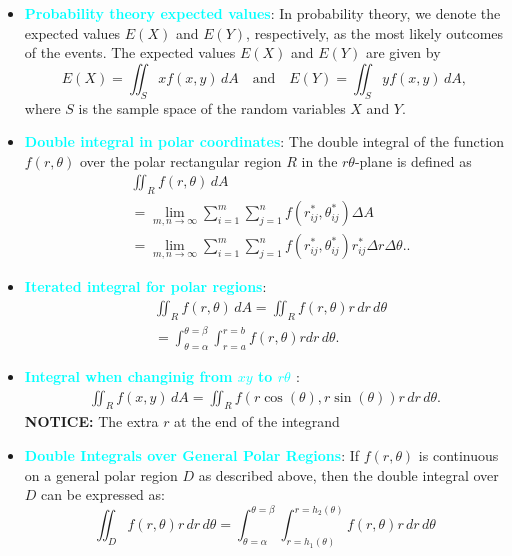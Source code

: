 \documentclass{report}
\begin{document}
\begin{itemize}
        \item \textbf{\textcolor{cyan}{Probability theory expected values}}:
            In probability theory, we denote the expected values \(E(X)\) and \(E(Y)\), respectively, as the most likely outcomes of the events. The expected values \(E(X)\) and \(E(Y)\) are given by
            \[
                E(X) = \iint_S x f(x,y) \, dA \quad \text{and} \quad E(Y) = \iint_S y f(x,y) \, dA,
            \]
            where \(S\) is the sample space of the random variables \(X\) and \(Y\).
        \item \textbf{\textcolor{cyan}{Double integral in polar coordinates}}:
            The double integral of the function $f(r,\theta)$ over the polar rectangular region $R$ in the $r\theta$-plane is defined as
            \begin{align*}
                &\iint_R f(r,\theta) \, dA  \\
                &= \lim_{m,n \to \infty} \sum_{i=1}^{m} \sum_{j=1}^{n} f(r^*_{ij}, \theta^*_{ij}) \Delta A  \\
                &= \lim_{m,n \to \infty} \sum_{i=1}^{m} \sum_{j=1}^{n} f(r^*_{ij}, \theta^*_{ij}) r^*_{ij} \Delta r \Delta \theta.
            .\end{align*}
        \item \textbf{\textcolor{cyan}{Iterated integral for polar regions}}:
            \begin{align*}
                &\iint_R f(r,\theta )\, dA = \iint_R f(r,\theta )r \, dr \, d\theta \\
                &=\int_{\theta =\alpha}^{\theta =\beta} \int_{r=a}^{r=b}f(r,\theta )r dr\, d\theta 
            .\end{align*}
        \item \textbf{\textcolor{cyan}{Integral when changinig from $xy$ to $r\theta$ }}:
            \begin{align*}
                \iint_R f(x,y)\, dA = \iint_R f(r\cos{\left(\theta \right)}, r\sin{\left(\theta \right)})r\, dr\, d\theta 
            .\end{align*}
            \textbf{NOTICE:} The extra $r$ at the end of the integrand
        \item \textbf{\textcolor{cyan}{Double Integrals over General Polar Regions}}:
            If $f(r,\theta)$ is continuous on a general polar region $D$ as described above, then the double integral over $D$ can be expressed as:
            \[
                \iint_D f(r,\theta) r \, dr \, d\theta = \int_{\theta=\alpha}^{\theta=\beta} \int_{r=h_1(\theta)}^{r=h_2(\theta)} f(r,\theta) r \, dr \, d\theta
\]
\end{itemize}
\end{document}
